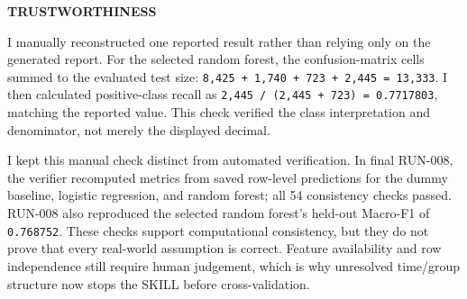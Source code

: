 \documentclass[10pt,a4paper,twocolumn]{article}
\begin{document}
\vspace{2pt}
{\noindent\fontsize{11}{13}\selectfont\bfseries\color{accent}TRUSTWORTHINESS\par}
\vspace{2pt}

I manually reconstructed one reported result rather than relying only on the generated report. For the selected random forest, the confusion-matrix cells summed to the evaluated test size: \texttt{8,425 + 1,740 + 723 + 2,445 = 13,333}. I then calculated positive-class recall as \texttt{2,445 / (2,445 + 723) = 0.7717803}, matching the reported value. This check verified the class interpretation and denominator, not merely the displayed decimal.

I kept this manual check distinct from automated verification. In final RUN-008, the verifier recomputed metrics from saved row-level predictions for the dummy baseline, logistic regression, and random forest; all 54 consistency checks passed. RUN-008 also reproduced the selected random forest's held-out Macro-F1 of \texttt{0.768752}. These checks support computational consistency, but they do not prove that every real-world assumption is correct. Feature availability and row independence still require human judgement, which is why unresolved time/group structure now stops the SKILL before cross-validation.
\endgroup
\end{document}
